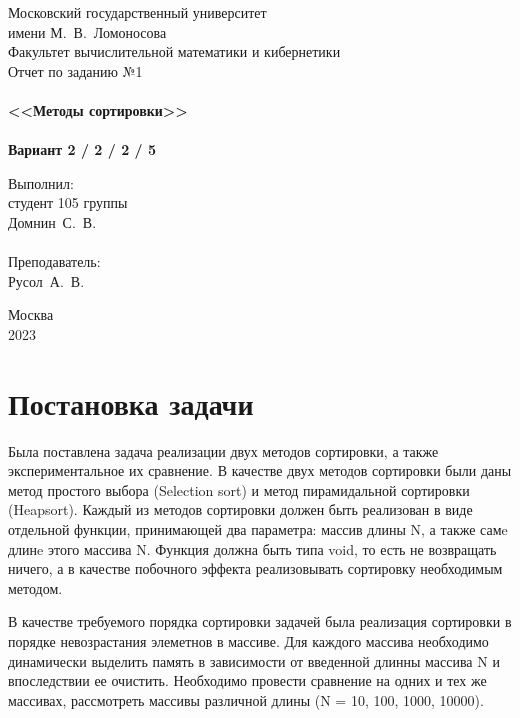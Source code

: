 \documentclass[a4paper,12pt,titlepage,finall]{article}
\begin{document}
\begin{titlepage}
    \begin{center}
	{\small \sc Московский государственный университет \\имени М.~В.~Ломоносова\\
	Факультет вычислительной математики и кибернетики\\}
	\vfill
	{\Large \sc Отчет по заданию №1}\\
	~\\
	{\large \bf <<Методы сортировки>>}\\ 
	~\\
	{\large \bf Вариант 2 / 2 / 2 / 5}
    \end{center}
    \begin{flushright}
	\vfill {Выполнил:\\
	студент 105 группы\\
	Домнин~С.~В.\\
	~\\
	Преподаватель:\\
	Русол~А.~В.}
    \end{flushright}
    \begin{center}
	\vfill
	{\small Москва\\2023}
    \end{center}
\end{titlepage}

\tableofcontents
\newpage

\section{Постановка задачи}

Была поставлена задача реализации двух методов сортировки, а также экспериментальное их сравнение. В качестве двух методов сортировки были даны метод простого выбора (Selection sort) и метод пирамидальной сортировки (Heapsort). Каждый из методов сортировки должен быть реализован в виде отдельной функции, принимающей два параметра: массив длины N, а также самe длинe этого массива N. Функция должна быть типа void, то есть не возвращать ничего, а в качестве побочного эффекта реализовывать сортировку необходимым методом. \par

В качестве требуемого порядка сортировки задачей была реализация сортировки в порядке невозрастания элеметнов в массиве. Для каждого массива необходимо динамически выделить память в зависимости от введенной длинны массива N и впоследствии ее очистить. Необходимо провести сравнение на одних и тех же массивах, рассмотреть массивы различной длины (N = 10, 100, 1000, 10000). \par
\end{document}
